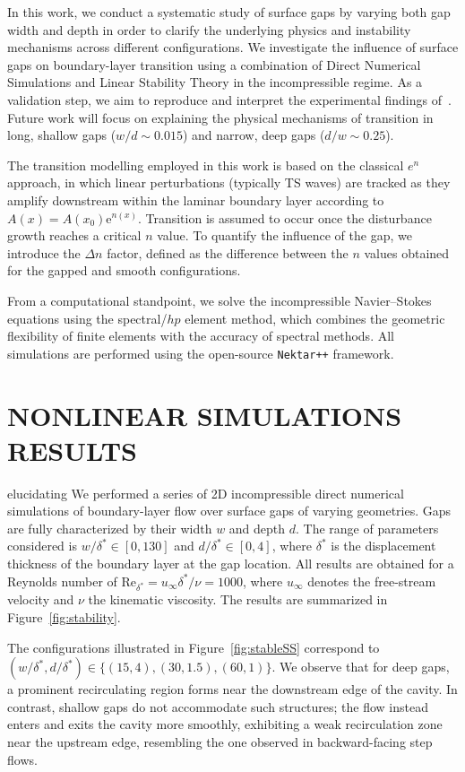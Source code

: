 \documentclass[twocolumn,10pt]{tsfp}
\begin{document}
In this work, we conduct a systematic study of surface gaps by varying both gap width and depth in order to clarify the underlying physics and instability mechanisms across different configurations. We investigate the influence of surface gaps on boundary-layer transition using a combination of Direct Numerical Simulations and Linear Stability Theory in the incompressible regime. As a validation step, we aim to reproduce and interpret the experimental findings of~\cite{jeffGaps}. Future work will focus on explaining the physical mechanisms of transition in long, shallow gaps ($w/d \sim 0.015$) and narrow, deep gaps ($d/w \sim 0.25$).

The transition modelling employed in this work is based on the classical $e^n$ approach, in which linear perturbations (typically TS waves) are tracked as they amplify downstream within the laminar boundary layer according to $A(x) = A(x_0) \mathrm{e}^{n(x)}$. Transition is assumed to occur once the disturbance growth reaches a critical $n$ value. To quantify the influence of the gap, we introduce the $\Delta n$ factor, defined as the difference between the $n$ values obtained for the gapped and smooth configurations. 

From a computational standpoint, we solve the incompressible Navier--Stokes equations using the spectral/$hp$ element method, which combines the geometric flexibility of finite elements with the accuracy of spectral methods. All simulations are performed using the open-source \texttt{Nektar++} framework.

\section*{NONLINEAR SIMULATIONS RESULTS}elucidating
We performed a series of 2D incompressible direct numerical simulations of boundary-layer flow over surface gaps of varying geometries. Gaps are fully characterized by their width $w$ and depth $d$. The range of parameters considered is $w/\delta^* \in [0,130]$ and $d/\delta^* \in [0,4]$, where $\delta^*$ is the displacement thickness of the boundary layer at the gap location. All results are obtained for a Reynolds number of $\mathrm{Re}_{\delta^*} = u_\infty \delta^*/\nu = 1000$, where $u_\infty$ denotes the free-stream velocity and $\nu$ the kinematic viscosity. The results are summarized in Figure~\ref{fig:stability}.

The configurations illustrated in Figure~\ref{fig:stableSS} correspond to $(w/\delta^*, d/\delta^*) \in \{(15,4), (30,1.5), (60,1)\}$. We observe that for deep gaps, a prominent recirculating region forms near the downstream edge of the cavity. In contrast, shallow gaps do not accommodate such structures; the flow instead enters and exits the cavity more smoothly, exhibiting a weak recirculation zone near the upstream edge, resembling the one observed in backward-facing step flows.
\end{document}
